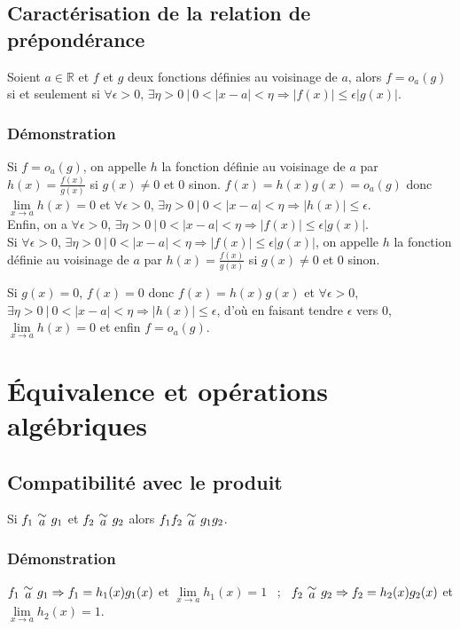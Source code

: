 \documentclass[a4paper,10pt]{book} %
\newcommand{\R}{\mathbb{R}}
\newcommand{\equi}[1]{\renewcommand{\arraystretch}{0.3}~\begin{matrix}\sim\\#1\end{matrix}~\renewcommand{\arraystretch}{1}}
\newcommand{\abs}[1]{\left|#1\right|}
\newcommand{\tq}{~|~}
\begin{document}
\subsection*{Caractérisation de la relation de prépondérance}\label{prop1}
Soient $a \in \R$ et $f$ et $g$ deux fonctions définies au voisinage de $a$, alors $f=o_a(g)$ si et seulement si 
$\forall \epsilon>0$, $\exists \eta>0 ~|~ 0<|x-a|<\eta\Rightarrow |f(x)|\leq \epsilon|g(x)|$.

\subsubsection*{Démonstration}
Si $f=o_a(g)$, on appelle $h$ la fonction définie au voisinage de $a$ par $h(x)=\frac{f(x)}{g(x)}$ si $g(x)\neq 0$ et $0$ sinon. $f(x)=h(x)g(x)=o_a(g)$ donc $\lim\limits_{x\rightarrow a}h(x)=0$ et $\forall \epsilon>0$, $\exists \eta>0 \tq 0<\abs{x-a}<\eta \Rightarrow \abs{h(x)}\leq\epsilon$.\\
Enfin, on a $\forall \epsilon>0$, $\exists \eta>0 ~|~ 0<|x-a|<\eta\Rightarrow |f(x)|\leq \epsilon|g(x)|$.\\

Si $\forall \epsilon>0$, $\exists \eta>0 ~|~ 0<|x-a|<\eta\Rightarrow |f(x)|\leq \epsilon|g(x)|$, on appelle $h$ la fonction définie au voisinage de $a$ par $h(x)=\frac{f(x)}{g(x)}$ si $g(x)\neq 0$ et $0$ sinon.

Si $g(x)=0$, $f(x)=0$ donc $f(x)=h(x)g(x)$ et $\forall \epsilon>0$, $\exists \eta>0 ~|~ 0<|x-a|<\eta\Rightarrow |h(x)|\leq \epsilon$, d'où en faisant tendre $\epsilon$ vers 0, $\lim\limits_{x\rightarrow a}h(x)=0$ et enfin $f=o_a(g)$.


\newpage

\section{Équivalence et opérations algébriques}
\subsection{Compatibilité avec le produit}
Si $f_1 \equi{a} g_1$ et $f_2 \equi{a} g_2$ alors $f_1f_2 \equi{a} g_1g_2$.

\subsubsection{Démonstration}
$f_1 \equi{a} g_1 \Rightarrow f_1=h_1(x)g_1(x)$ et $\lim\limits_{x\rightarrow a}h_1(x)=1$ ~;~ 
$f_2 \equi{a} g_2 \Rightarrow f_2=h_2(x)g_2(x)$ et $\lim\limits_{x\rightarrow a}h_2(x)=1$.
\end{document}
